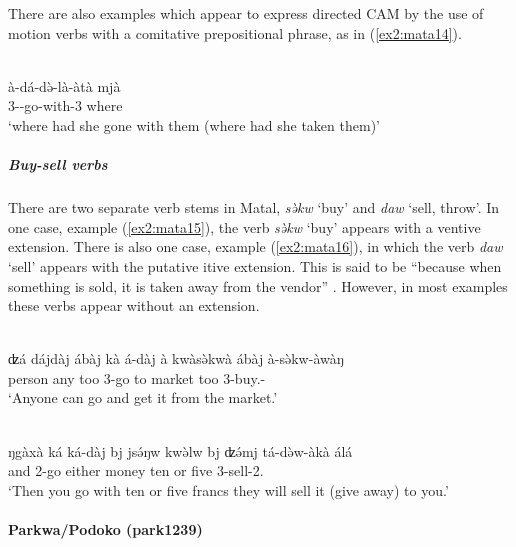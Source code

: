 There are also examples which appear to express directed CAM by the use of motion verbs with a comitative prepositional phrase, as in (\ref{ex2:mata14}). 

\ea\label{ex2:mata14}
 \\
\gll  à-dá-də̀-là-àtà mjà \\
3--go-with-3 where \\ 
\glt `where had she gone with them (where had she taken them)'
\z

\subparagraph{Buy-sell verbs}

There are two separate verb stems in Matal, \textit{sə̀kw} `buy' and \textit{daw} `sell, throw'. In one case, example (\ref{ex2:mata15}), the verb \textit{sə̀kw} `buy' appears with a ventive extension. There is also one case, example (\ref{ex2:mata16}), in which the verb \textit{daw} `sell' appears with the putative itive extension. This is said to be ``because when something is sold, it is taken away from the vendor'' \citep[189]{dougopheGrammarMatal2021}. However, in most examples these verbs appear without an extension. 

\ea\label{ex2:mata15}
 \\
\gll ʣá 	dájdàj  ábàj 	 kà á-dàj	 à 	kwàsə̀kwà 	ábàj	 à-sə̀kw-àwàŋ \\
person	any	too	 3-go	to	market 		too	3-buy.- \\
\glt `Anyone can go and get it from the market.'

\ex\label{ex2:mata16}
 \\
\gll ŋgàxà ká 	ká-dàj 	bj 	jsə́ŋw 	kwə̀lw 	bj 	ʣə́mj	tá-də̀w-àkà 	álá \\
and 	 	2-go 	either	 money 	ten 	or 	five 	3-sell-2.  \\
\glt `Then you go with ten or five francs they will sell it (give away) to you.'
\z 

\paragraph*{Parkwa/Podoko (park1239)} \label{park}

